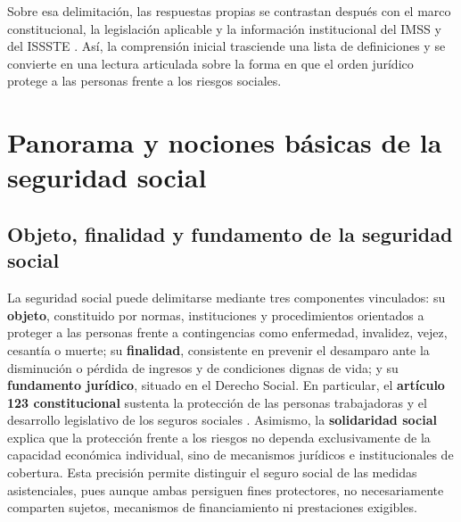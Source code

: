 \documentclass[12pt,letterpaper,oneside]{article}
\begin{document}
Sobre esa delimitación, las respuestas propias se contrastan después con el marco constitucional, la legislación aplicable y la información institucional del IMSS y del ISSSTE \citep{imssSitio2026,isssteSitio2026}. Así, la comprensión inicial trasciende una lista de definiciones y se convierte en una lectura articulada sobre la forma en que el orden jurídico protege a las personas frente a los riesgos sociales.

\section{Panorama y nociones básicas de la seguridad social}

\subsection{Objeto, finalidad y fundamento de la seguridad social}
La seguridad social puede delimitarse mediante tres componentes vinculados: su \textbf{objeto}, constituido por normas, instituciones y procedimientos orientados a proteger a las personas frente a contingencias como enfermedad, invalidez, vejez, cesantía o muerte; su \textbf{finalidad}, consistente en prevenir el desamparo ante la disminución o pérdida de ingresos y de condiciones dignas de vida; y su \textbf{fundamento jurídico}, situado en el Derecho Social. En particular, el \textbf{artículo 123 constitucional} sustenta la protección de las personas trabajadoras y el desarrollo legislativo de los seguros sociales \citep{cpeum2026,lss2026}.
Asimismo, la \textbf{solidaridad social} explica que la protección frente a los riesgos no dependa exclusivamente de la capacidad económica individual, sino de mecanismos jurídicos e institucionales de cobertura. Esta precisión permite distinguir el seguro social de las medidas asistenciales, pues aunque ambas persiguen fines protectores, no necesariamente comparten sujetos, mecanismos de financiamiento ni prestaciones exigibles.
\end{document}
